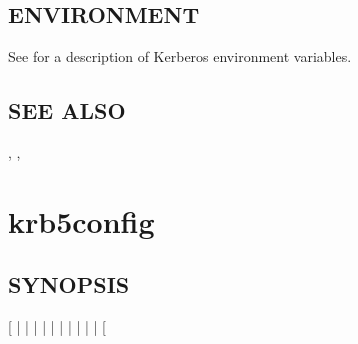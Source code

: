 \documentclass[letterpaper,10pt,english]{sphinxmanual}
\begin{document}
\subsection{ENVIRONMENT}
\label{\detokenize{user/user_commands/kpasswd:environment}}
\sphinxAtStartPar
See {\hyperref[\detokenize{user/user_config/kerberos:kerberos-7}]{}} for a description of Kerberos environment
variables.


\subsection{SEE ALSO}
\label{\detokenize{user/user_commands/kpasswd:see-also}}
\sphinxAtStartPar
{}, , {\hyperref[\detokenize{user/user_config/kerberos:kerberos-7}]{}}

\sphinxstepscope


\section{krb5\sphinxhyphen{}config}
\label{\detokenize{user/user_commands/krb5-config:krb5-config}}\label{\detokenize{user/user_commands/krb5-config:krb5-config-1}}\label{\detokenize{user/user_commands/krb5-config::doc}}

\subsection{SYNOPSIS}
\label{\detokenize{user/user_commands/krb5-config:synopsis}}
\sphinxAtStartPar
{}
{[}\sphinxstylestrong{\sphinxhyphen{}} | \sphinxstylestrong{\sphinxhyphen{}} | \sphinxstylestrong{\sphinxhyphen{}} | \sphinxstylestrong{\sphinxhyphen{}} | \sphinxstylestrong{\sphinxhyphen{}} | \sphinxstylestrong{\sphinxhyphen{}} | \sphinxstylestrong{\sphinxhyphen{}} | \sphinxstylestrong{\sphinxhyphen{}} | \sphinxstylestrong{\sphinxhyphen{}} | \sphinxstylestrong{\sphinxhyphen{}} | \sphinxstylestrong{\sphinxhyphen{}} {[}\sphinxstyleemphasis{libraries}{]}{]}
\end{document}
